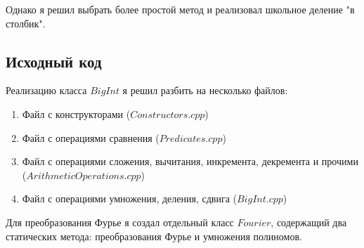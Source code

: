 \documentclass[12pt]{article}
\begin{document}
Однако я решил выбрать более простой метод и реализовал школьное деление "в столбик".
	\subsection*{Исходный код}
	Реализацию класса $BigInt$ я решил разбить на несколько файлов:
	\begin{enumerate}
		\item Файл с конструкторами ($Constructors.cpp$)
		\item Файл с операциями сравнения ($Predicates.cpp$)
		\item Файл с операциями сложения, вычитания, инкремента, декремента и прочими ($ArithmeticOperations.cpp$)
		\item Файл с операциями умножения, деления, сдвига ($BigInt.cpp$)
	\end{enumerate}
	Для преобразования Фурье я создал отдельный класс $Fourier$, содержащий два статических метода: преобразования Фурье и умножения полиномов.
	
	\noindent\makebox[\linewidth]{\rule{\paperwidth}{0.4pt}}
	\inputminted[breaklines]{C++}{../src/Fourier.h}
	\vspace{5mm}
	\noindent\makebox[\linewidth]{\rule{\paperwidth}{0.4pt}}
	\inputminted[breaklines]{C++}{../src/Fourier.cpp}
	\vspace{5mm}
	\noindent\makebox[\linewidth]{\rule{\paperwidth}{0.4pt}}
	
	\inputminted[breaklines]{C++}{../src/BigInt.h}
	\vspace{5mm}
	\noindent\makebox[\linewidth]{\rule{\paperwidth}{0.4pt}}
	
	\inputminted[breaklines]{C++}{../src/BigInt.cpp}
	\vspace{5mm}
	\noindent\makebox[\linewidth]{\rule{\paperwidth}{0.4pt}}
	
	\inputminted[breaklines]{C++}{../src/Constructors.cpp}
	\vspace{5mm}
	\noindent\makebox[\linewidth]{\rule{\paperwidth}{0.4pt}}
	
	\inputminted[breaklines]{C++}{../src/Predicates.cpp}
	\vspace{5mm}
	\noindent\makebox[\linewidth]{\rule{\paperwidth}{0.4pt}}
	
		\inputminted[breaklines]{C++}{../src/ArithmeticOperations.cpp}
	\vspace{5mm}
	\noindent\makebox[\linewidth]{\rule{\paperwidth}{0.4pt}}
	
	\inputminted[breaklines]{C++}{../src/main.cpp}
	\newpage
\end{document}
